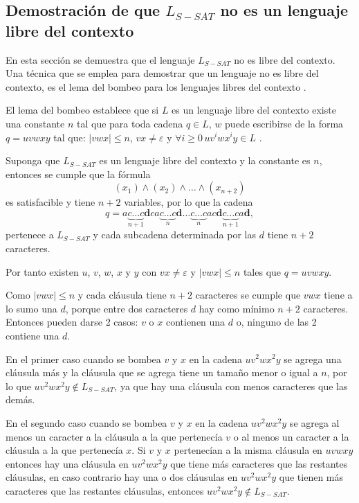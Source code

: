 \subsection{Demostración de que $L_{S-SAT}$ no es un lenguaje libre del contexto}

En esta sección se demuestra que el lenguaje $L_{S-SAT}$ no es libre del contexto. Una técnica que se emplea para demostrar que un lenguaje no es libre del contexto, es el lema del bombeo para los lenguajes
libres del contexto \cite{authomataTheory}. 

El lema del bombeo establece que si $L$ es un lenguaje libre del contexto
existe una constante $n$ tal que para toda cadena $q\in L$, $w$ puede escribirse de la forma $q=uvwxy$ tal que:
$|vwx|\leq n$, $vx\neq \varepsilon$ y $\forall i\geq 0\,uv^iwx^iy\in L$ \cite{authomataTheory}.

Suponga que $L_{S-SAT}$ es un lenguaje libre del contexto y la constante es $n$, entonces se cumple que la fórmula
$$(x_1)\wedge(x_2)\wedge\ldots\wedge(x_{n+2})$$ es satisfacible y tiene $n+2$ variables, por lo que la cadena
$$q=a\underbrace{c\ldots c}_{n+1}\mathbf{d}ca\underbrace{c\ldots c}_{n}\mathbf{d}\ldots \underbrace{c\ldots c}_{n}ac\mathbf{d}\underbrace{c\ldots c}_{n+1}a\mathbf{d},$$
pertenece a $L_{S-SAT}$ y cada subcadena determinada por las $d$ tiene $n+2$ caracteres. 

Por tanto existen $u$, $v$, $w$, $x$ y $y$ con $vx\neq \varepsilon$ y $|vwx|\leq n$
tales que $q=uvwxy$.

Como $|vwx|\leq n$ y cada cláusula tiene $n+2$ caracteres se cumple que $vwx$ tiene a lo sumo una $d$, porque entre dos caracteres $d$ hay como mínimo $n+2$ caracteres. Entonces pueden darse 2 casos: $v$ o $x$
contienen una $d$ o, ninguno de las 2 contiene una $d$.

En el primer caso cuando se bombea $v$ y $x$ en la cadena $uv^2wx^2y$ se agrega una cláusula más y la cláusula
que se agrega tiene un tamaño menor o igual a $n$, por lo que $uv^2wx^2y\notin L_{S-SAT}$, ya que hay una cláusula
con menos caracteres que las demás.

En el segundo caso cuando se bombea $v$ y $x$ en la cadena $uv^2wx^2y$
se agrega al menos un caracter a la cláusula a la que pertenecía $v$ o al menos un caracter a la cláusula a la que pertenecía $x$.
Si $v$ y $x$ pertenecían a la misma cláusula en $uvwxy$ entonces hay una cláusula en $uv^2wx^2y$ que tiene más caracteres que las restantes cláusulas,
en caso contrario hay una o dos cláusulas en $uv^2wx^2y$ que tienen más caracteres que las restantes cláusulas, entonces $uv^2wx^2y\notin L_{S-SAT}$.

